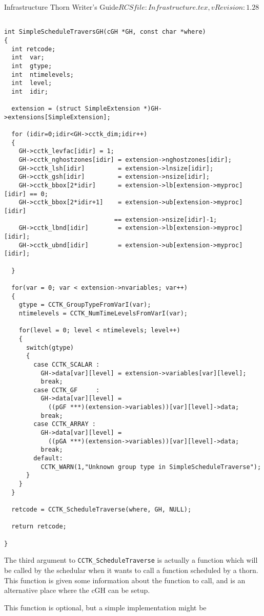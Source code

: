 \begin{cactuspart}{4}{Infrastructure Thorn Writer's Guide}{$RCSfile: Infrastructure.tex,v $}{$Revision: 1.28 $}
\begin{verbatim}

int SimpleScheduleTraversGH(cGH *GH, const char *where)
{
  int retcode;
  int  var;
  int  gtype;
  int  ntimelevels;
  int  level;
  int  idir;

  extension = (struct SimpleExtension *)GH->extensions[SimpleExtension];

  for (idir=0;idir<GH->cctk_dim;idir++)
  {
    GH->cctk_levfac[idir] = 1;
    GH->cctk_nghostzones[idir] = extension->nghostzones[idir];
    GH->cctk_lsh[idir]         = extension->lnsize[idir];
    GH->cctk_gsh[idir]         = extension->nsize[idir];
    GH->cctk_bbox[2*idir]      = extension->lb[extension->myproc][idir] == 0;
    GH->cctk_bbox[2*idir+1]    = extension->ub[extension->myproc][idir] 
                              == extension->nsize[idir]-1;
    GH->cctk_lbnd[idir]        = extension->lb[extension->myproc][idir];
    GH->cctk_ubnd[idir]        = extension->ub[extension->myproc][idir];
    
  }

  for(var = 0; var < extension->nvariables; var++)
  {
    gtype = CCTK_GroupTypeFromVarI(var);
    ntimelevels = CCTK_NumTimeLevelsFromVarI(var);

    for(level = 0; level < ntimelevels; level++)
    {
      switch(gtype)
      {
        case CCTK_SCALAR :
          GH->data[var][level] = extension->variables[var][level]; 
          break;
        case CCTK_GF     :
          GH->data[var][level] = 
            ((pGF ***)(extension->variables))[var][level]->data; 
          break;
        case CCTK_ARRAY :
          GH->data[var][level] = 
            ((pGA ***)(extension->variables))[var][level]->data; 
          break;
        default:
          CCTK_WARN(1,"Unknown group type in SimpleScheduleTraverse");
      }
    }
  }

  retcode = CCTK_ScheduleTraverse(where, GH, NULL);

  return retcode;

}

\end{verbatim}

The third argument to {\tt CCTK\_ScheduleTraverse} is actually a function
which will be called by the schedular when it wants to call a function
scheduled by a thorn.  This function is given some information about
the function to call, and is an alternative place where the cGH can be setup.

This function is optional, but a simple implementation might be


\end{cactuspart}
